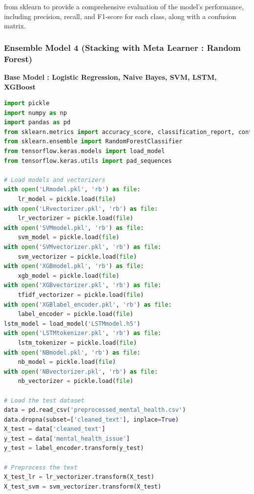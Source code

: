 from sklearn to provide a comprehensive evaluation of the model's performance, including precision, recall, and F1-score for each class, along with a confusion matrix.


\subsubsection{Ensemble Model 4 (Stacking with Meta Learner : Random Forest)}

\noindent
\textbf{Base Model : Logistic Regression, Naive Bayes, SVM, LSTM, XGBoost}

\begin{tcolorbox}[colback=gray!5!white, colframe=gray!80!black, boxrule=0.5pt, title=Evaluate Meta-Learner and Ensemble Model 4]
    \begin{lstlisting}[language=Python]
import pickle
import numpy as np
import pandas as pd
from sklearn.metrics import accuracy_score, classification_report, confusion_matrix
from sklearn.ensemble import RandomForestClassifier
from tensorflow.keras.models import load_model
from tensorflow.keras.utils import pad_sequences

# Load models and vectorizers
with open('LRmodel.pkl', 'rb') as file:
    lr_model = pickle.load(file)
with open('LRvectorizer.pkl', 'rb') as file:
    lr_vectorizer = pickle.load(file)
with open('SVMmodel.pkl', 'rb') as file:
    svm_model = pickle.load(file)
with open('SVMvectorizer.pkl', 'rb') as file:
    svm_vectorizer = pickle.load(file)
with open('XGBmodel.pkl', 'rb') as file:
    xgb_model = pickle.load(file)
with open('XGBvectorizer.pkl', 'rb') as file:
    tfidf_vectorizer = pickle.load(file)
with open('XGBlabel_encoder.pkl', 'rb') as file:
    label_encoder = pickle.load(file)
lstm_model = load_model('LSTMmodel.h5')
with open('LSTMtokenizer.pkl', 'rb') as file:
    lstm_tokenizer = pickle.load(file)
with open('NBmodel.pkl', 'rb') as file:
    nb_model = pickle.load(file)
with open('NBvectorizer.pkl', 'rb') as file:
    nb_vectorizer = pickle.load(file)

# Load the test dataset
data = pd.read_csv('preprocessed_mental_health.csv')
data.dropna(subset=['cleaned_text'], inplace=True)
X_test = data['cleaned_text']
y_test = data['mental_health_issue']
y_test = label_encoder.transform(y_test)

# Preprocess the text
X_test_lr = lr_vectorizer.transform(X_test)
X_test_svm = svm_vectorizer.transform(X_test)
\end{lstlisting}
\end{tcolorbox}
